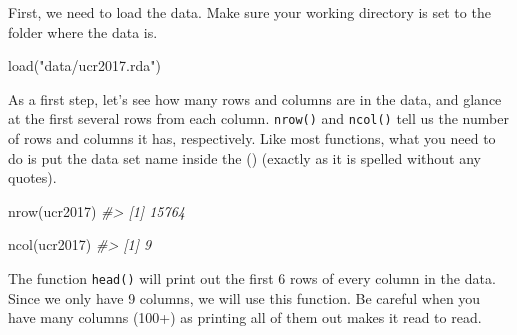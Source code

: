\documentclass[
  12pt,
  openany]{book}
\newenvironment{Shaded}{\begin{snugshade}}{\end{snugshade}}
\newcommand{\CommentTok}[1]{\textcolor[rgb]{0.37,0.37,0.37}{\textit{#1}}}
\newcommand{\FunctionTok}[1]{\textcolor[rgb]{0,0,0}{#1}}
\newcommand{\NormalTok}[1]{#1}
\newcommand{\StringTok}[1]{\textcolor[rgb]{0.5,0.5,0.5}{#1}}
\begin{document}
First, we need to load the data. Make sure your working directory is set to the folder where the data is.

\begin{Shaded}
\begin{Highlighting}[]
\FunctionTok{load}\NormalTok{(}\StringTok{"data/ucr2017.rda"}\NormalTok{)}
\end{Highlighting}
\end{Shaded}

As a first step, let's see how many rows and columns are in the data, and glance at the first several rows from each column. \texttt{nrow()} and \texttt{ncol()} tell us the number of rows and columns it has, respectively. Like most functions, what you need to do is put the data set name inside the () (exactly as it is spelled without any quotes).

\begin{Shaded}
\begin{Highlighting}[]
\FunctionTok{nrow}\NormalTok{(ucr2017)}
\CommentTok{\#\textgreater{} [1] 15764}
\end{Highlighting}
\end{Shaded}

\begin{Shaded}
\begin{Highlighting}[]
\FunctionTok{ncol}\NormalTok{(ucr2017)}
\CommentTok{\#\textgreater{} [1] 9}
\end{Highlighting}
\end{Shaded}

The function \texttt{head()} will print out the first 6 rows of every column in the data. Since we only have 9 columns, we will use this function. Be careful when you have many columns (100+) as printing all of them out makes it read to read.
\end{document}
